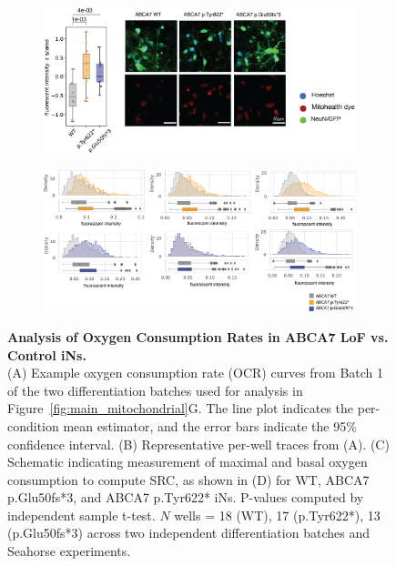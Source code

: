 \begin{figure}[ht]
    \begin{subfigure}[t]{0.7\textwidth}
        \caption{}
        \includegraphics[width=\textwidth]{./extended_plots/mitohealth_dye.png}        
    \end{subfigure}
    \par
    \begin{subfigure}[t]{\textwidth}
        \caption{}
        \includegraphics[width=\textwidth]{./extended_plots/mitohealth_per_cell.png}        
    \end{subfigure}
    \caption{
         \textbf{Analysis of Oxygen Consumption Rates in ABCA7 LoF vs. Control iNs.}\\[1ex]
         (A) Example oxygen consumption rate (OCR) curves from Batch 1 of the two differentiation batches used for analysis in Figure~\ref{fig:main_mitochondrial}G. The line plot indicates the per-condition mean estimator, and the error bars indicate the 95\% confidence interval. 
         (B) Representative per-well traces from (A). 
         (C) Schematic indicating measurement of maximal and basal oxygen consumption to compute SRC, as shown in 
         (D) for WT, ABCA7 p.Glu50fs*3, and ABCA7 p.Tyr622* iNs. P-values computed by independent sample t-test. $N$ wells = 18 (WT), 17 (p.Tyr622*), 13 (p.Glu50fs*3) across two independent differentiation batches and Seahorse experiments. 
}
\end{figure}

